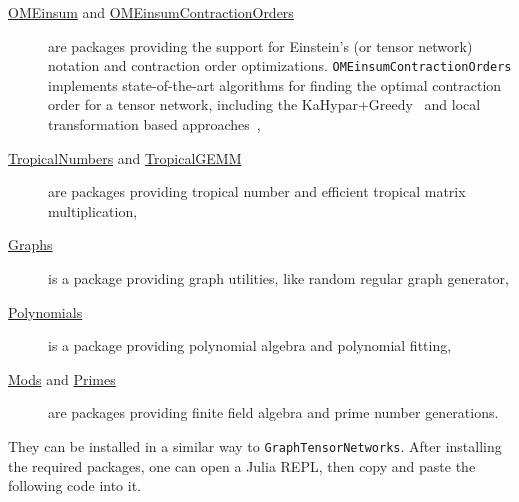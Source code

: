 \documentclass[onefignum, onetabnum]{siamart190516}
\newcommand{\<}{\langle}
\renewcommand{\>}{\rangle}
\begin{document}
\begin{description}
	\item[\href{https://github.com/under-Peter/OMEinsum.jl}{OMEinsum} and \href{https://github.com/Happy-Diode/OMEinsumContractionOrders.jl}{OMEinsumContractionOrders}] are packages providing the support for Einstein's (or tensor network) notation and contraction order optimizations.
    \texttt{OMEinsumContractionOrders} implements state-of-the-art algorithms for finding the optimal contraction order for a tensor network, including the KaHypar+Greedy~\cite{Gray2021, Pan2021} and local transformation based approaches~\cite{Kalachev2021},
	\item[\href{https://github.com/TensorBFS/TropicalNumbers.jl}{TropicalNumbers} and \href{https://github.com/TensorBFS/TropicalGEMM.jl}{TropicalGEMM}] are packages providing tropical number and efficient tropical matrix multiplication,
	\item[\href{https://github.com/JuliaGraphs/Graphs.jl}{Graphs}] is a package providing graph utilities, like random regular graph generator,
	\item[\href{https://github.com/JuliaMath/Polynomials.jl}{Polynomials}] is a package providing polynomial algebra and polynomial fitting,
	\item[\href{https://github.com/scheinerman/Mods.jl}{Mods} and \href{https://github.com/JuliaMath/Primes.jl}{Primes}] are packages providing finite field algebra and prime number generations.
\end{description}

They can be installed in a similar way to \texttt{GraphTensorNetworks}.
After installing the required packages, one can open a Julia REPL, then copy and paste the following code into it.


\end{document}
